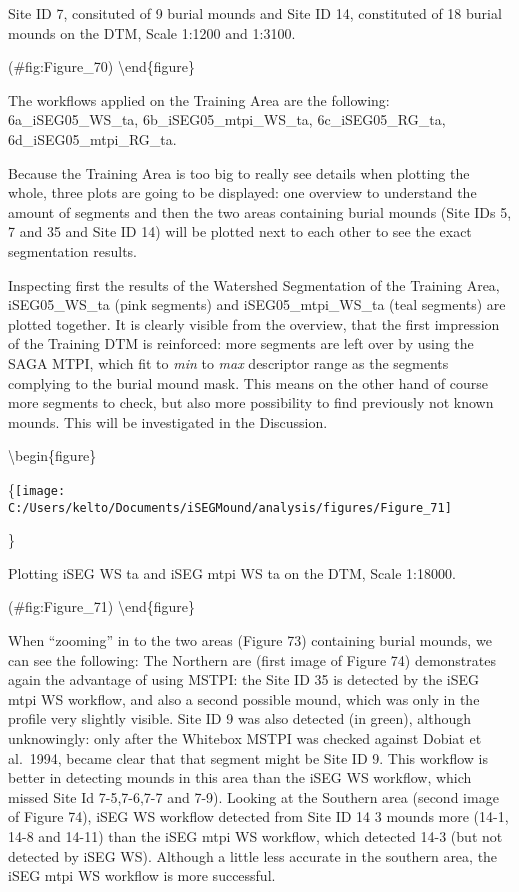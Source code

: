 \documentclass[
]{article}
\begin{document}
\caption{Site ID 7, consituted of 9 burial mounds and Site ID 14, constituted of 18 burial mounds on the DTM, Scale 1:1200 and 1:3100.}

(\#fig:Figure\_70)
\textbackslash end\{figure\}

The workflows applied on the Training Area are the following:
6a\_iSEG05\_WS\_ta, 6b\_iSEG05\_mtpi\_WS\_ta, 6c\_iSEG05\_RG\_ta, 6d\_iSEG05\_mtpi\_RG\_ta.

Because the Training Area is too big to really see details when plotting the whole, three plots are going to be displayed: one overview to understand the amount of segments and then the two areas containing burial mounds (Site IDs 5, 7 and 35 and Site ID 14) will be plotted next to each other to see the exact segmentation results.

Inspecting first the results of the Watershed Segmentation of the Training Area, iSEG05\_WS\_ta (pink segments) and iSEG05\_mtpi\_WS\_ta (teal segments) are plotted together. It is clearly visible from the overview, that the first impression of the Training DTM is reinforced: more segments are left over by using the SAGA MTPI, which fit to \emph{min} to \emph{max} descriptor range as the segments complying to the burial mound mask. This means on the other hand of course more segments to check, but also more possibility to find previously not known mounds. This will be investigated in the Discussion.

\textbackslash begin\{figure\}

\{\centering \texttt{[image: C:/Users/kelto/Documents/iSEGMound/analysis/figures/Figure\_71]}

\}

\caption{Plotting iSEG WS ta and iSEG mtpi WS ta on the DTM, Scale 1:18000.}

(\#fig:Figure\_71)
\textbackslash end\{figure\}

When ``zooming'' in to the two areas (Figure 73) containing burial mounds, we can see the following:
The Northern are (first image of Figure 74) demonstrates again the advantage of using MSTPI: the Site ID 35 is detected by the iSEG mtpi WS workflow, and also a second possible mound, which was only in the profile very slightly visible. Site ID 9 was also detected (in green), although unknowingly: only after the Whitebox MSTPI was checked against Dobiat et al.~1994, became clear that that segment might be Site ID 9. This workflow is better in detecting mounds in this area than the iSEG WS workflow, which missed Site Id 7-5,7-6,7-7 and 7-9).
Looking at the Southern area (second image of Figure 74), iSEG WS workflow detected from Site ID 14 3 mounds more (14-1, 14-8 and 14-11) than the iSEG mtpi WS workflow, which detected 14-3 (but not detected by iSEG WS).
Although a little less accurate in the southern area, the iSEG mtpi WS workflow is more successful.
\end{document}
